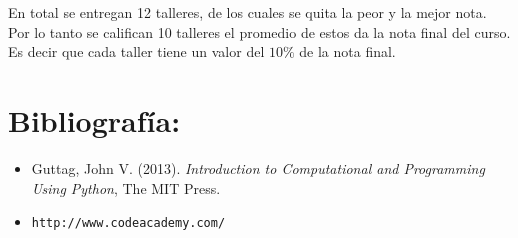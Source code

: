 \documentclass[letterpaper]{article}
\begin{document}
En total se entregan 12 talleres, de los cuales se quita la peor y la mejor nota. 
Por lo tanto se califican 10 talleres el promedio de estos da la nota final del curso. Es decir que 
cada taller tiene un valor del $10\%$ de la nota final.

\section*{Bibliograf\'ia:}
\begin{itemize}
\item Guttag, John V. (2013). \textit{Introduction to Computational and Programming Using Python}, The MIT Press.
\item \verb"http://www.codeacademy.com/"
\end{itemize}
\end{document}
